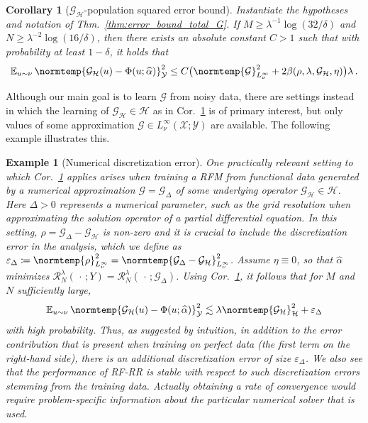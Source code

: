 \documentclass{article}
\theoremstyle{plain}
\newtheorem{corollary}[theorem]{Corollary}
\theoremstyle{my_def}
\newtheorem{example}[theorem]{Example}
\theoremstyle{my_rem}
\numberwithin{equation}{section}
\numberwithin{theorem}{section}%
\newcommand{\E}{\mathbb{E}}
\newcommand{\scrR}{\mathscr{R}}
\newcommand{\cG}{\mathcal{G}}
\newcommand{\cH}{\mathcal{H}}
\newcommand{\cX}{\mathcal{X}}
\newcommand{\cY}{\mathcal{Y}}
\newcommand{\norm}{\normtemp}
\renewcommand{\hat}{\widehat}
\newcommand{\slot}{{\,\cdot\,}}
\newcommand{\defeq}{\coloneqq} %
\renewcommand{\E}{\operatorname{\mathbb{E}}} %
\newcommand{\al}{\alpha}
\newcommand{\GH}{\cG_{\cH}}
\newcommand{\eps}{\varepsilon}
\renewcommand{\epsilon}{\varepsilon}
\newcommand{\alhat}{\hat{\al}}
\begin{document}
\begin{corollary}[$\GH$-population squared error bound]\label{cor:error_bound_total_GH}
    Instantiate the hypotheses and notation of Thm.~\ref{thm:error_bound_total_G}. If $M \ge \lambda^{-1}\log(32/\delta)$ and $N\geq \lambda^{-2}\log(16/\delta)$, then there exists an absolute constant $C>1$ such that with probability at least $1-\delta$, it holds that
    \begin{equation}\label{eq:error_bound_total_GH}
        \E_{u\sim\nu}\norm{\GH(u)-\Phi(u;\alhat)}_{\cY}^2 \leq C\bigl(\norm{\cG}_{L^\infty_\nu}^2 + 2 \beta(\rho,\lambda,\GH,\eta)\bigr)\lambda\,.
    \end{equation}
\end{corollary}

Although our main goal is to learn $\cG$ from noisy data, there are settings instead in which the learning of $\GH\in\cH$ as in Cor.~\ref{cor:error_bound_total_GH} is of primary interest, but only values of some approximation $\cG\in L^\infty_\nu(\cX;\cY)$ are available. The following example illustrates this.
\begin{example}[Numerical discretization error]\label{ex:discretization}
One practically relevant setting to which Cor.~\ref{cor:error_bound_total_GH} applies arises when training a RFM from functional data generated by a numerical approximation $\cG=\cG_\Delta$ of some underlying operator $\GH\in\cH$. Here $\Delta > 0$ represents a numerical parameter, such as the grid resolution when approximating the solution operator of a partial differential equation. In this setting, $\rho = \cG_\Delta-\GH$ is non-zero and it is crucial to include the discretization error in the analysis, which we define as $\eps_{\Delta}\defeq \norm{\rho}_{L^\infty_\nu}^2=\norm{\cG_\Delta - \GH}_{L^\infty_\nu}^2$. Assume $\eta\equiv 0$, so that $\alhat$ minimizes $\scrR^\lambda_N(\slot;Y)=\scrR^\lambda_N(\slot;\cG_\Delta)$. Using Cor.~\ref{cor:error_bound_total_GH}, it follows that for $M$ and $N$ sufficiently large,
\begin{equation}\label{eq:discretization}
    \E_{u\sim\nu}\norm{\GH(u)-\Phi(u;\alhat)}_{\cY}^2\lesssim \lambda\norm{\GH}_\cH^2 + \eps_{\Delta}
\end{equation}
with high probability. Thus, as suggested by intuition, in addition to the error contribution that is present when training on perfect data (the first term on the right-hand side), there is an additional discretization error of size $\epsilon_\Delta$. We also see that the performance of RF-RR is stable with respect to such discretization errors stemming from the training data. Actually obtaining a rate of convergence would require problem-specific information about the particular numerical solver that is used.
\end{example}
\end{document}
